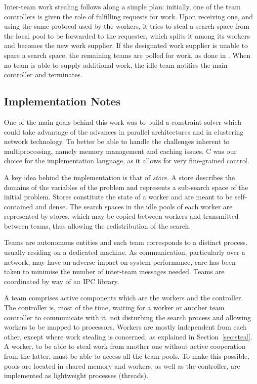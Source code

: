 \documentclass{llncs}
\begin{document}
Inter-team work stealing follows along a simple plan: initially, one
of the team controllers is given the role of fulfilling requests for
work. Upon receiving one, and using the same protocol used by the
workers, it tries to steal a search space from the local pool to be
forwarded to the requester, which splits it among its workers and
becomes the new work supplier. If the designated work supplier is
unable to spare a search space, the remaining teams are polled for
work, as done in \cite{par-simple:trics00}. When no team is able to
supply additional work, the idle team notifies the main controller and
terminates.

\subsection{Implementation Notes}

One of the main goals behind this work was to build a constraint
solver which could take advantage of the advances in parallel
architectures and in clustering network technology. To better be able
to handle the challenges inherent to multiprocessing, namely memory
management and caching issues, C was our choice for the implementation
language, as it allows for very fine-grained control.

A key idea behind the implementation is that of \emph{store}. A store
describes the domains of the variables of the problem and represents a
sub-search space of the initial problem. Stores constitute the state
of a worker and are meant to be self-contained and dense. The search
spaces in the idle pools of each worker are represented by stores,
which may be copied between workers and transmitted between teams,
thus allowing the redistribution of the search.

Teams are autonomous entities and each team corresponds to a distinct
process, usually residing on a dedicated machine. As communication,
particularly over a network, may have an adverse impact on system
performance, care has been taken to minimise the number of inter-team
messages needed. Teams are coordinated by way of an IPC library.

A team comprises active components which are the workers and the
controller. The controller is, most of the time, waiting for a worker
or another team controller to communicate with it, not disturbing the
search process and allowing workers to be mapped to processors.
Workers are mostly independent from each other, except where work
stealing is concerned, as explained in Section~\ref{sec:steal}. A
worker, to be able to steal work from another one without active
cooperation from the latter, must be able to access all the team
pools. To make this possible, pools are located in shared memory and
workers, as well as the controller, are implemented as lightweight
processes (threads).
\end{document}
